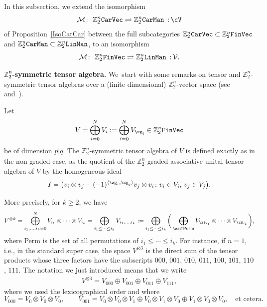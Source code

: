 \documentclass[pdftex]{sigma}%
\newcommand{\op}[1]{\operatorname{#1}}
\newcommand{\Z}{{\mathbb Z}}
\def\ul{\underline}
\def\cM{\cal M}
\def\cM{\mathcal{M}}
\def\ul{\underline}
\newcommand{\0}{\otimes}
\numberwithin{equation}{section}
\begin{document}
In this subsection, we extend the isomorphism
\[
\cM\colon\ \Z_2^n{\tt CarVec}\rightleftharpoons\Z_2^n{\tt CarMan}\ \,{:}\, \cV
\]
of Proposition~\ref{IsoCatCar} between the full subcategories $\Z_2^n{\tt CarVec}\subset\Z_2^n{\tt FinVec}$ and $\Z_2^n{\tt CarMan}\subset\Z_2^n{\tt LinMan}$, to an isomorphism
\[
\mathcal{M}\colon\ \Z_2^n{\tt FinVec}\rightleftharpoons\Z_2^n{\tt LinMan}\ \,{:}\, \mathcal{V}.
\]

\noindent\textbf{$\boldsymbol{\Z_2^n}$-symmetric tensor algebra.} We~start with some remarks on tensor and $\Z_2^n$-symmetric tensor algebras over a (finite dimensional) $\Z_2^n$-vector space (see~\cite{Manin1988} and~\cite{BP13}).

Let
\[
V=\bigoplus_{i=0}^NV_{i}:=\bigoplus_{i=0}^NV_{\zg_i}\in\Z_2^n{\tt FinVec}
\]
be of dimension $p|\ul{q}$. The $\Z_2^n$-symmetric tensor algebra of $V$ is defined exactly as in the non-graded case, as the quotient of the $\Z_2^n$-graded associative unital tensor algebra of $V$ by the homogeneous ideal
\[
\bar{I}=\big(v_i \otimes v_j - (-1)^{\langle \zg_i, \zg_j \rangle } v_j \otimes v_i\colon v_i \in V_i,\, v_j \in V_j \big).
\]

More precisely, for $k\ge 2$, we have
\begin{gather*}%
V^{\0 k}=\bigoplus_{i_1,\dots, i_k=0}^NV_{i_1}\0\cdots\0V_{i_k}=\bigoplus_{i_1\le\cdots\le i_k}V_{i_1,\dots,i_k}:=\bigoplus_{i_1\le\cdots\le i_k}\bigg(\bigoplus_{\zs\in\op{Perm}}V_{\zs_{i_1}}\0\cdots\0V_{\zs_{i_k}}\bigg),
\end{gather*}
where Perm is the set of all permutations of $i_1\le\cdots\le i_k$. For instance, if $n=1$, i.e., in the standard super case, the space $V^{\0 3}$ is the direct sum of the tensor products whose three factors have the subscripts $000$, $001$, $010$, $011$, $100$, $101$, $110$, $111$. The notation we just introduced means that we write
\begin{gather*}%
V^{\0 3}=V_{000}\oplus V_{001}\oplus V_{011}\oplus V_{111},
\end{gather*}
where we used the lexicographical order and where
\[
V_{000}=V_0\0V_0\0V_0,\qquad
V_{001}=V_0\0V_0\0V_1\oplus V_0\0V_1\0V_0\oplus V_1\0V_0\0V_0,\quad
\text{et cetera}.
\]
\end{document}
